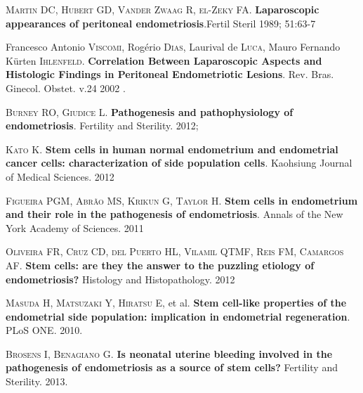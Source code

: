 \documentclass[12pt]{article} %
\begin{document}
\vspace{0,5cm}

\textsc{Martin DC, Hubert GD, Vander Zwaag R, el-Zeky FA}. \textbf{Laparoscopic appearances of peritoneal endometriosis}.Fertil Steril 1989; 51:63-7

\vspace{0,5cm}

Francesco Antonio \textsc{Viscomi}, Rogério \textsc{Dias}, Laurival de \textsc{Luca}, Mauro Fernando Kürten \textsc{Ihlenfeld}. \textbf{Correlation Between Laparoscopic Aspects and Histologic Findings in Peritoneal Endometriotic Lesions}. Rev. Bras. Ginecol. Obstet. v.24 2002 .

\vspace{0,5cm}

\textsc{Burney RO, Giudice L}.\textbf{ Pathogenesis and pathophysiology of endometriosis}. Fertility and Sterility. 2012;

\vspace{0,5cm}

\textsc{Kato K}. \textbf{Stem cells in human normal endometrium and endometrial cancer cells: characterization of side population cells}. Kaohsiung Journal of Medical Sciences. 2012

\vspace{0,5cm}

\textsc{Figueira PGM, Abrão MS, Krikun G, Taylor H}.\textbf{ Stem cells in endometrium and their role in the pathogenesis of endometriosis}. Annals of the New York Academy of Sciences. 2011

\vspace{0,5cm}

\textsc{Oliveira FR, Cruz CD, del Puerto HL, Vilamil QTMF, Reis FM, Camargos AF}.\textbf{ Stem cells: are they the answer to the puzzling etiology of endometriosis?} Histology and Histopathology. 2012

\vspace{0,5cm}

\textsc{Masuda H, Matsuzaki Y, Hiratsu E}, et al.\textbf{ Stem cell-like properties of the endometrial side population: implication in endometrial regeneration}. PLoS ONE. 2010.

\vspace{0,5cm}

\textsc{Brosens I, Benagiano G}. \textbf{Is neonatal uterine bleeding involved in the pathogenesis of endometriosis as a source of stem cells?} Fertility and Sterility. 2013.

\vspace{0,5cm}
\end{document}
